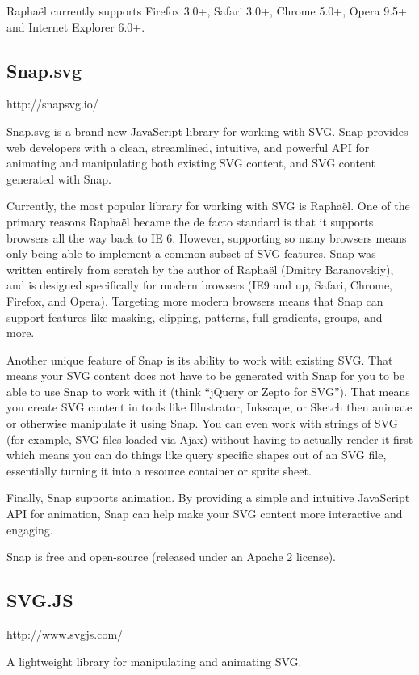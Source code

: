 Raphaël currently supports Firefox 3.0+, Safari 3.0+, Chrome 5.0+, Opera 9.5+ and Internet Explorer 6.0+. 


\subsection{Snap.svg }

http://snapsvg.io/

Snap.svg is a brand new JavaScript library for working with SVG. Snap provides web developers with a clean, streamlined, intuitive, and powerful API for animating and manipulating both existing SVG content, and SVG content generated with Snap.

Currently, the most popular library for working with SVG is Raphaël. One of the primary reasons Raphaël became the de facto standard is that it supports browsers all the way back to IE 6. However, supporting so many browsers means only being able to implement a common subset of SVG features. Snap was written entirely from scratch by the author of Raphaël (Dmitry Baranovskiy), and is designed specifically for modern browsers (IE9 and up, Safari, Chrome, Firefox, and Opera). Targeting more modern browsers means that Snap can support features like masking, clipping, patterns, full gradients, groups, and more.

Another unique feature of Snap is its ability to work with existing SVG. That means your SVG content does not have to be generated with Snap for you to be able to use Snap to work with it (think “jQuery or Zepto for SVG”). That means you create SVG content in tools like Illustrator, Inkscape, or Sketch then animate or otherwise manipulate it using Snap. You can even work with strings of SVG (for example, SVG files loaded via Ajax) without having to actually render it first which means you can do things like query specific shapes out of an SVG file, essentially turning it into a resource container or sprite sheet.

Finally, Snap supports animation. By providing a simple and intuitive JavaScript API for animation, Snap can help make your SVG content more interactive and engaging.

Snap is    free and   open-source (released under an Apache 2 license).

\subsection{SVG.JS}
http://www.svgjs.com/

A lightweight library for manipulating and animating SVG. 
    
